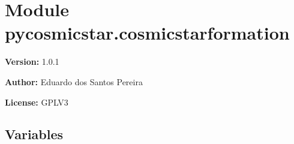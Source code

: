 %
%
%


\section{Module pycosmicstar.cosmicstarformation}

    \label{pycosmicstar:cosmicstarformation}
\textbf{Version:} 1.0.1



\textbf{Author:} Eduardo dos Santos Pereira



\textbf{License:} GPLV3





  \subsection{Variables}

